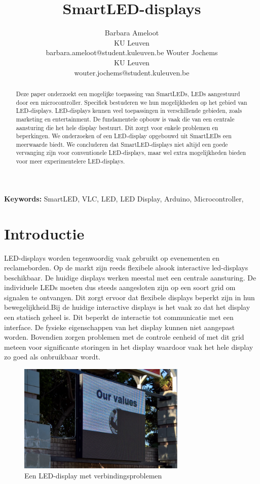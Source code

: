 \documentclass{article}
\title{SmartLED-displays}
\author{Barbara Ameloot\\
KU Leuven\\
barbara.ameloot@student.kuleuven.be
\And 
Wouter Jochems\\
KU Leuven\\
wouter.jochems@student.kuleuven.be}
\begin{document}
\maketitle

\begin{abstract}
Deze paper onderzoekt een mogelijke toepassing van SmartLEDs, LEDs aangestuurd door een microcontroller\cite{smartLED}. Specifiek bestuderen we hun mogelijkheden op het gebied van LED-displays. LED-displays kennen veel toepassingen in verschillende gebieden, zoals marketing en entertainment. De fundamentele opbouw is vaak die van een centrale aansturing die het hele display bestuurt. Dit zorgt voor enkele problemen en beperkingen. We onderzoeken of een LED-display opgebouwd uit SmartLEDs een meerwaarde biedt. We concluderen dat SmartLED-displays niet altijd een goede vervanging zijn voor conventionele LED-displays, maar wel extra mogelijkheden bieden voor meer experimentelere LED-displays.
\end{abstract}

{\bf Keywords:} SmartLED, VLC, LED, LED Display, Arduino, Microcontroller,


\section{Introductie}

LED-displays worden tegenwoordig vaak gebruikt op evenementen en reclameborden. Op de markt zijn reeds flexibele alsook interactive led-displays beschikbaar. De huidige displays werken meestal met een centrale aansturing. De individuele LEDs moeten dus steeds aangesloten zijn op een soort grid om signalen te ontvangen. Dit zorgt ervoor dat flexibele displays beperkt zijn in hun bewegelijkheid.Bij de huidige interactive displays is het vaak zo dat het display een statisch geheel is. Dit beperkt de interactie tot communicatie met een interface. De fysieke eigenschappen van het display kunnen niet aangepast worden. Bovendien zorgen problemen met de controle eenheid of met dit grid meteen voor significante storingen in het display\cite{brokenDisplay} waardoor vaak het hele display zo goed als onbruikbaar wordt.
\begin{figure}
\centering
\includegraphics[width=8cm]{broken.png}
\caption{Een LED-display met verbindingsproblemen}
\end{figure}
\end{document}
